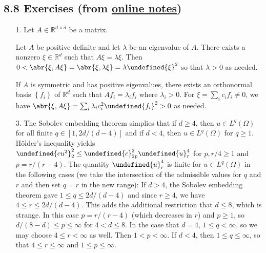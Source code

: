 \documentclass[11pt,leqno]{article}
\theoremstyle{plain}
\theoremstyle{definition}
\numberwithin{equation}{section}
\numberwithin{lem}{section}
\newcommand{\cbr}[1]{\left\{#1\right\}}
\let\norm\undefined %
\DeclarePairedDelimiter\norm{\lVert}{\rVert}
\begin{document}
\subsection*{8.8 Exercises (from \href{https://users.oden.utexas.edu/~arbogast/appMath08c.pdf}{online notes})}
\begin{enumerate}
    \item[1.] Let $A\in \mathbb R^{d\times d}$ be a matrix.
    
    Let $A$ be positive definite and let $\lambda$ be an eigenvalue of $A$. There exists a nonzero $\xi\in\mathbb R^d$ such that $A\xi = \lambda\xi$. Then $0 < \abr{\xi,A\xi} = \abr{\xi,\lambda\xi} = {\lambda}\norm{\xi}^2$ so that $\lambda > 0$ as needed. 
    
    If $A$ is symmetric and has positive eigenvalues, there exists an orthonormal basis $\cbr{f_i}$ of $\mathbb R^d$ such that $Af_i = \lambda_if_i$ where $\lambda_i>0$. For $\xi = \sum_i c_if_i\neq 0$, we have $\abr{\xi,A\xi} = \sum_i\lambda_ic_i^2\norm{f_i}^2 > 0$ as needed.
    \item[3.] The Sobolev embedding theorem simplies that if $d\geq 4$, then $u\in L^q(\Omega)$ for all finite $q\in [1,2d/(d-4)]$ and if $d<4$, then $u\in L^q(\Omega)$ for $q\geq 1$. H\"older's inequality yields $\norm{cu^2}_2^2\leq \norm{c}_{2p}^2\norm{u}_r^4$ for $p,r/4\geq 1$ and $p = r/(r-4)$. The quantity $\norm{u}_r^4$ is finite for $u\in L^q(\Omega)$ in the following cases (we take the intersection of the admissible values for $q$ and $r$ and then set $q = r$ in the new range): If $d>4$, the Sobolev embedding theorem gave $1\leq q \leq 2d/(d-4)$ and since $r\geq 4$, we have $4 \leq r\leq 2d/(d-4)$. This adds the additional restriction that $d\leq 8$, which is strange. In this case $p = r/(r-4)$ (which decreases in $r$) and $p\geq 1$, so $d/(8-d)\leq p \leq \infty$ for $4<d\leq 8$. In the case that $d = 4$, $1\leq q< \infty$, so we may choose $4\leq r <\infty$ as well. Then $1 < p <\infty$. If $d<4$, then $1\leq q\leq \infty$, so that $4\leq r\leq \infty$ and $1\leq p\leq \infty$. 
    

\end{enumerate}
\end{document}
